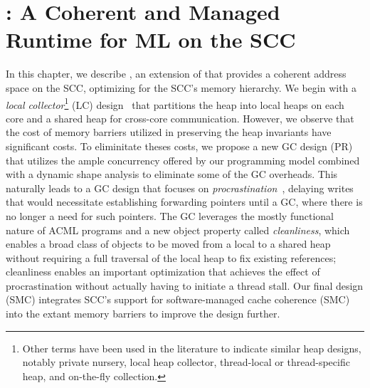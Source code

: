 \newcommand{\lc}{LC\xspace}
\newcommand{\prc}{PR\xspace}
\newcommand{\smc}{SMC\xspace}
\newcommand{\kcore}{k_{core}}
\newcommand{\kmesh}{k_{mesh}}
\newcommand{\kram}{k_{ram}}

\lstset{
language=C,
numbers=left,
numberstyle=\footnotesize,
frame=single}




\chapter{\MMSCC: A Coherent and Managed Runtime for ML on the SCC}
\label{chap:aneris}

In this chapter, we describe \MMSCC, an extension of \MM that provides a
coherent address space on the SCC, optimizing for the SCC's memory hierarchy.
We begin with a \emph{local collector}\footnote{Other terms have been used in
the literature to indicate similar heap designs, notably private nursery, local
heap collector, thread-local or thread-specific heap, and on-the-fly
collection.} (\lc) design~\cite{Steele75, Doligez93, Steensgaard00, Anderson10,
Marlow11, Auhagen11} that partitions the heap into local heaps on each core and
a shared heap for cross-core communication. However, we observe that the cost
of memory barriers utilized in preserving the heap invariants have significant
costs. To eliminitate theses costs, we propose a new GC design (\prc) that
utilizes the ample concurrency offered by our programming model combined with a
dynamic shape analysis to eliminate some of the GC overheads. This naturally
leads to a GC design that focuses on \emph{procrastination}~\cite{mmgc},
delaying writes that would necessitate establishing forwarding pointers until a
GC, where there is no longer a need for such pointers. The GC leverages the
mostly functional nature of ACML programs and a new object property called
\emph{cleanliness}, which enables a broad class of objects to be moved from a
local to a shared heap without requiring a full traversal of the local heap to
fix existing references; cleanliness enables an important optimization that
achieves the effect of procrastination without actually having to initiate a
thread stall. Our final design (\smc) integrates SCC's support for
software-managed cache coherence (SMC)~\cite{SMC} into the extant memory
barriers to improve the design further.

